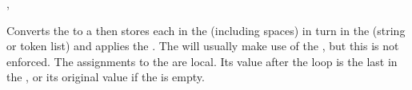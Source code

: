 \documentclass[oneside]{book}
\begin{document}
\begin{function}{\StrMapVariable,\StrMapVariable}
\begin{syntax}
   
   
\end{syntax}
Converts the  to a  then stores each
 in the  (including spaces) in turn in
the (string or token list)  and applies the
.  The  will usually make use of the
, but this is not enforced.  The assignments to the
 are local.  Its value after the loop is the last
 in the , or its original value if the
 is empty.
\begin{demohigh}
\IgnoreSpacesOn
\StrClear \lTmpaStr
{} \lTmpiStr {
  \StrPutRight \lTmpaStr {\Expand {[\lTmpiStr]}}
}
\StrUse \lTmpaStr
\IgnoreSpacesOff
\end{demohigh}
\end{function}

%
\end{document}
